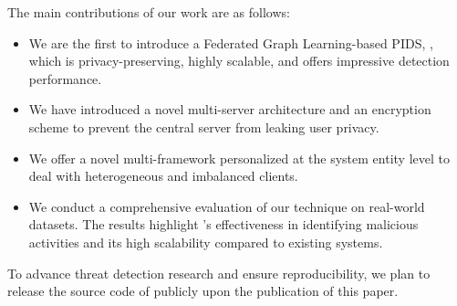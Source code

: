 The main contributions of our work are as follows:

\begin{itemize}[topsep=.1ex,itemsep=-.1ex,leftmargin=*]
    \item We are the first to introduce a Federated Graph Learning-based PIDS, \Sys, which is privacy-preserving, highly scalable, and offers impressive detection performance.
    \item We have introduced a novel multi-server architecture and an encryption scheme to prevent the central server from leaking user privacy.
    \item We offer a novel multi-\gnnshort framework personalized at the system entity level to deal with heterogeneous and imbalanced clients.
    \item We conduct a comprehensive evaluation of our technique on real-world datasets. The results highlight \Sys's effectiveness in identifying malicious activities and its high scalability compared to existing systems.
\end{itemize}

 To advance threat detection research and ensure reproducibility, we plan to release the source code of \Sys publicly upon the publication of this paper.